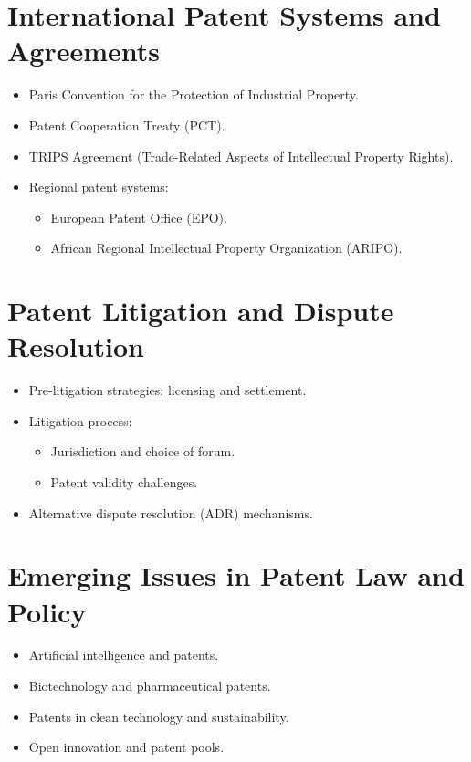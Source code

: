 \section{International Patent Systems and Agreements}
\begin{itemize}
    \item Paris Convention for the Protection of Industrial Property.
    \item Patent Cooperation Treaty (PCT).
    \item TRIPS Agreement (Trade-Related Aspects of Intellectual Property Rights).
    \item Regional patent systems:
    \begin{itemize}
        \item European Patent Office (EPO).
        \item African Regional Intellectual Property Organization (ARIPO).
    \end{itemize}
\end{itemize}

\section{Patent Litigation and Dispute Resolution}
\begin{itemize}
    \item Pre-litigation strategies: licensing and settlement.
    \item Litigation process:
    \begin{itemize}
        \item Jurisdiction and choice of forum.
        \item Patent validity challenges.
    \end{itemize}
    \item Alternative dispute resolution (ADR) mechanisms.
\end{itemize}

\section{Emerging Issues in Patent Law and Policy}
\begin{itemize}
    \item Artificial intelligence and patents.
    \item Biotechnology and pharmaceutical patents.
    \item Patents in clean technology and sustainability.
    \item Open innovation and patent pools.
\end{itemize}

